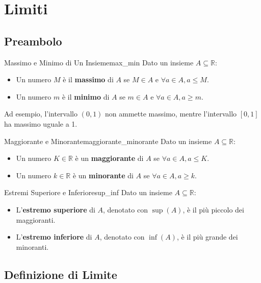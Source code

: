\documentclass{article}
\begin{document}
\section{Limiti}

\subsection{Preambolo}

\begin{definition}{Massimo e Minimo di Un Insieme}{max_min}
    Dato un insieme $A \subseteq \mathbb{R}$:
    \begin{itemize}
        \item Un numero $M$ è il \textbf{massimo} di $A$ se $M \in A$ e $\forall a \in A, a \le M$.
        \item Un numero $m$ è il \textbf{minimo} di $A$ se $m \in A$ e $\forall a \in A, a \ge m$.
    \end{itemize}
\end{definition}

Ad esempio, l'intervallo $(0,1)$ non ammette massimo, mentre l'intervallo $[0,1]$ ha massimo uguale a 1.

\begin{definition}{Maggiorante e Minorante}{maggiorante_minorante}
    Dato un insieme $A \subseteq \mathbb{R}$:
    \begin{itemize}
        \item Un numero $K \in \mathbb{R}$ è un \textbf{maggiorante} di $A$ se $\forall a \in A, a \le K$.
        \item Un numero $k \in \mathbb{R}$ è un \textbf{minorante} di $A$ se $\forall a \in A, a \ge k$.
    \end{itemize}
\end{definition}

\begin{definition}{Estremi Superiore e Inferiore}{sup_inf}
    Dato un insieme $A \subseteq \mathbb{R}$:
    \begin{itemize}
        \item L'\textbf{estremo superiore} di $A$, denotato con $\sup(A)$, è il più piccolo dei maggioranti.
        \item L'\textbf{estremo inferiore} di $A$, denotato con $\inf(A)$, è il più grande dei minoranti.
    \end{itemize}
\end{definition}

\subsection{Definizione di Limite}
\end{document}
